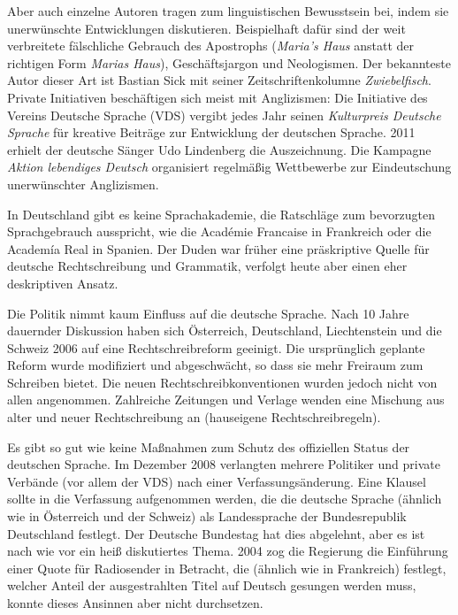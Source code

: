 \documentclass[]{../../metanetpaper}
\begin{document}
\begin{Parallel}[c]{79mm}{78mm}
{Aber auch einzelne Autoren tragen zum linguistischen Bewusstsein bei, indem sie unerwünschte Entwicklungen diskutieren. Beispielhaft dafür sind der weit verbreitete fälschliche Gebrauch des Apostrophs (\textit{Maria’s Haus} anstatt der richtigen Form \textit{Marias Haus}), Geschäftsjargon und Neologismen. Der bekannteste Autor dieser Art ist Bastian Sick\cite{Sick1} mit seiner Zeitschriftenkolumne \textit{Zwiebelfisch}\cite{Sick2}. Private Initiativen beschäftigen sich meist mit Anglizismen: Die Initiative des Vereins Deutsche Sprache (VDS) vergibt jedes Jahr seinen \textit{Kulturpreis Deutsche Sprache} für kreative Beiträge zur Entwicklung der deutschen Sprache. 2011 erhielt der deutsche Sänger Udo Lindenberg die Auszeichnung. Die Kampagne \textit{Aktion lebendiges Deutsch} organisiert regelmäßig Wettbewerbe zur Eindeutschung unerwünschter Anglizismen. 

In Deutschland gibt es keine Sprachakademie, die Ratschläge zum bevorzugten Sprachgebrauch ausspricht, wie die Académie Francaise in Frankreich oder die Academía Real in Spanien. Der Duden war früher eine präskriptive Quelle für deutsche Rechtschreibung und Grammatik, verfolgt heute aber einen eher deskriptiven Ansatz\cite{Schn1}. 

Die Politik nimmt kaum Einfluss auf die deutsche Sprache. Nach 10 Jahre dauernder Diskussion haben sich Österreich, Deutschland, Liechtenstein und die Schweiz 2006 auf eine Rechtschreibreform geeinigt. Die ursprünglich geplante Reform wurde modifiziert und abgeschwächt, so dass sie mehr Freiraum zum Schreiben bietet. Die neuen Rechtschreibkonventionen wurden jedoch nicht von allen angenommen. Zahlreiche Zeitungen und Verlage wenden eine Mischung aus alter und neuer Rechtschreibung an (hauseigene Rechtschreibregeln).

Es gibt so gut wie keine Maßnahmen zum Schutz des offiziellen Status der deutschen Sprache. Im Dezember 2008 verlangten mehrere Politiker und private Verbände (vor allem der VDS) nach einer Verfassungsänderung. Eine Klausel sollte in die Verfassung aufgenommen werden, die die deutsche Sprache (ähnlich wie in Österreich und der Schweiz) als Landessprache der Bundesrepublik Deutschland festlegt. Der Deutsche Bundestag hat dies abgelehnt, aber es ist nach wie vor ein heiß diskutiertes Thema. 2004 zog die Regierung die Einführung einer Quote für Radiosender in Betracht, die (ähnlich wie in Frankreich) festlegt, welcher Anteil der ausgestrahlten Titel auf Deutsch gesungen werden muss, konnte dieses Ansinnen aber nicht durchsetzen.

}
\end{Parallel}
\end{document}

